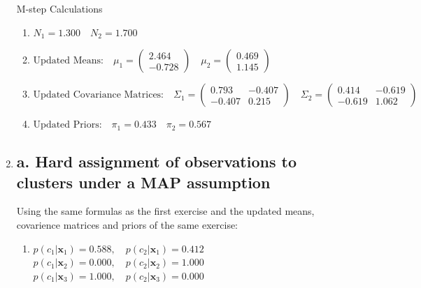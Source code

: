 \documentclass[12pt]{article}
\begin{document}
\begin{enumerate}[leftmargin=0pt, label=\textbf{\arabic*.)}]
          M-step Calculations \\
          \begin{enumerate}
              \item[]
                    $N_1 = 1.300  \quad N_2 = 1.700$ \\

              \item[]
                    $\text{Updated Means:} \quad \mu_1 = \begin{pmatrix} 2.464 \\ -0.728 \end{pmatrix} \quad \mu_2 = \begin{pmatrix} 0.469 \\ 1.145 \end{pmatrix}$ \\

              \item[]
                    $\text{Updated Covariance Matrices:} \quad \Sigma_1 = \begin{pmatrix} 0.793 & -0.407 \\ -0.407 & 0.215 \end{pmatrix} \quad \Sigma_2 = \begin{pmatrix} 0.414 & -0.619 \\ -0.619 & 1.062 \end{pmatrix}$ \\

              \item[]
                    $\text{Updated Priors:} \quad \pi_1 = 0.433 \quad \pi_2 = 0.567$ \\
          \end{enumerate}

    \item
          \subsection*{a. Hard assignment of observations to clusters under a MAP assumption}
          Using the same formulas as the first exercise and the updated means, covarience matrices and priors of the same exercise:
          \begin{enumerate}
              \item[]
                    $p(c_1 | \mathbf{x}_1) = 0.588, \quad p(c_2 | \mathbf{x}_1) = 0.412$ \\
                    $p(c_1 | \mathbf{x}_2) = 0.000, \quad p(c_2 | \mathbf{x}_2) = 1.000$ \\
                    $p(c_1 | \mathbf{x}_3) = 1.000, \quad p(c_2 | \mathbf{x}_3) = 0.000$ \\


\end{enumerate}
\end{enumerate}
\end{document}
